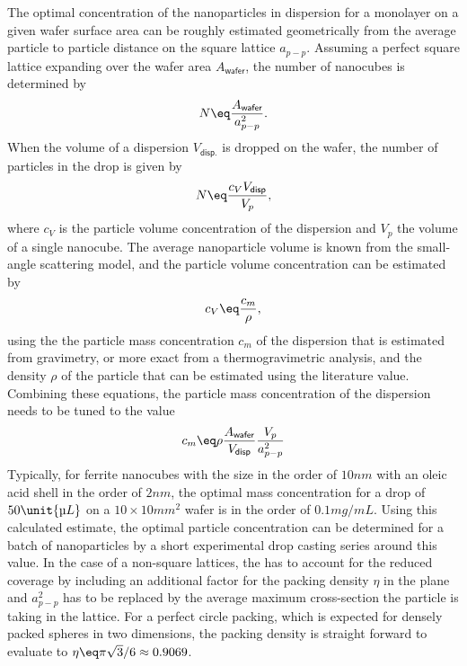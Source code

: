 \documentclass[\main/dresen_thesis.tex]{subfiles}
\begin{document}
  The optimal concentration of the nanoparticles in dispersion for a monolayer on a given wafer surface area can be roughly estimated geometrically from the average particle to particle distance on the square lattice $a_{p-p}$.
  Assuming a perfect square lattice expanding over the wafer area $A_{\textsf{wafer}}$, the number of nanocubes is determined by
  \begin{align}
    N \eq \frac{A_{\textsf{wafer}}}{a_{p-p}^2}.
  \end{align}
  When the volume of a dispersion $V_{\textsf{disp.}}$ is dropped on the wafer, the number of particles in the drop is given by
  \begin{align}
    N \eq \frac{c_V V_{\textsf{disp}}}{V_p},
  \end{align}
  where $c_V$ is the particle volume concentration of the dispersion and $V_p$ the volume of a single nanocube.
  The average nanoparticle volume is known from the small-angle scattering model, and the particle volume concentration can be estimated by
  \begin{align}
    c_V \eq \frac{c_m}{\rho},
  \end{align}
  using the the particle mass concentration $c_m$ of the dispersion that is estimated from gravimetry, or more exact from a thermogravimetric analysis, and the density $\rho$ of the particle that can be estimated using the literature value.
  Combining these equations, the particle mass concentration of the dispersion needs to be tuned to the value
  \begin{align}\label{eq:monolayers:preparation:particleConcentration}
    c_m \eq \rho \frac{A_{\textsf{wafer}}}{V_{\textsf{disp}}} \frac{V_p}{a_{p-p}^2}
  \end{align}
  Typically, for ferrite nanocubes with the size in the order of $10 \unit{nm}$ with an oleic acid shell in the order of $2 \unit{nm}$, the optimal mass concentration for a drop of $50 \unit{\text{\textmu} L}$ on a $10\times 10 \unit{mm^2}$ wafer is in the order of $0.1 \unit{mg/mL}$.
  Using this calculated estimate, the optimal particle concentration can be determined for a batch of nanoparticles by a short experimental drop casting series around this value.
  In the case of a non-square lattices, the  has to account for the reduced coverage by including an additional factor for the packing density $\eta$ in the plane and $a_{p-p}^2$ has to be replaced by the average maximum cross-section the particle is taking in the lattice.
  For a perfect circle packing, which is expected for densely packed spheres in two dimensions, the packing density is straight forward to evaluate to $\eta \eq \pi \sqrt{3} / 6 \approx 0.9069$.
\end{document}
